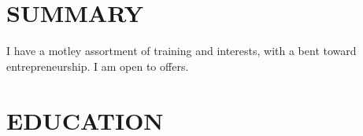 \documentclass[margin, 10pt]{res} %
\newcommand{\comment}[1]{}
\begin{document}
\begin{resume}


\section{SUMMARY}

I have a motley assortment of training and interests, with a bent toward entrepreneurship. I am open to offers. 






\section{EDUCATION}


\end{resume}
\end{document}
